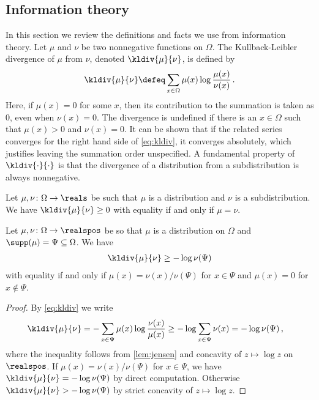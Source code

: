 \subsection{Information theory}
\label{sec:info}
In this section we review the definitions and 
facts we use from information theory.
Let $\mu$ and $\nu$ be two 
nonnegative functions on $\Omega$.
The Kullback-Leibler divergence \cite{Wald1945, KullbackL1951}
of $\mu$ from $\nu$,
denoted $\kldiv{\mu}{\nu}$, is defined by
%
\begin{align}
\label{eq:kldiv}
  \kldiv{\mu}{\nu} \defeq \sum_{x\in \Omega}
      \mu(x)\log\frac{\mu(x)}{\nu(x)}\,.
\end{align}
%
Here, if $\mu(x)=0$ for some $x$, then its contribution
to the summation is taken as 0, even when $\nu(x)=0$.
The divergence is undefined if there is an
$x\in \Omega$ such that $\mu(x)>0$ and
$\nu(x)=0$.
It can be shown that if the related series 
converges for the right hand side of \autoref{eq:kldiv},
it converges absolutely, 
which justifies leaving the summation order unspecified.
A fundamental property of 
$\kldiv{\cdot}{\cdot}$ is that
the divergence of a distribution from a subdistribution 
is always nonnegative.
\begin{lemma}
\label{lem:gibbs}
Let $\mu,\nu\colon\Omega\to\reals$ be such that $\mu$ is a
distribution and $\nu$ is a subdistribution.
We have $\kldiv{\mu}{\nu}\ge 0$ with equality if and
only if $\mu=\nu$.
\end{lemma}
\begin{lemma}
\label{lem:klcond}
Let $\mu,\nu\colon\Omega\to\realspos$ be so that
$\mu$ is a distribution on $\Omega$ and 
$\supp(\mu) = \Psi\subseteq\Omega$. We have
\begin{align*}
\kldiv{\mu}{\nu}\ge -\log \nu(\Psi)
\end{align*}
with equality if and only if $\mu(x) = \nu(x)/\nu(\Psi)$ for
$x\in\Psi$ and $\mu(x) = 0$ for $x\notin\Psi$.
\end{lemma}
\begin{proof}
By \autoref{eq:kldiv} we write
\begin{align*}
\kldiv{\mu}{\nu} &= -\sum_{x\in \Psi}
    \mu(x)\log\frac{\nu(x)}{\mu(x)}
  \ge -\log\sum_{x\in \Psi}\nu(x) =-\log \nu(\Psi)\,,
\end{align*}
where the inequality follows from
\autoref{lem:jensen} and concavity of
$z\mapsto\log z$ on $\realspos$. 
If $\mu(x) = \nu(x)/\nu(\Psi)$ for $x\in\Psi$, we have 
$\kldiv{\mu}{\nu}=-\log \nu(\Psi)$ by direct computation.
Otherwise $\kldiv{\mu}{\nu}>-\log\nu(\Psi)$ by strict 
concavity of $z\mapsto\log z$.
\end{proof}

